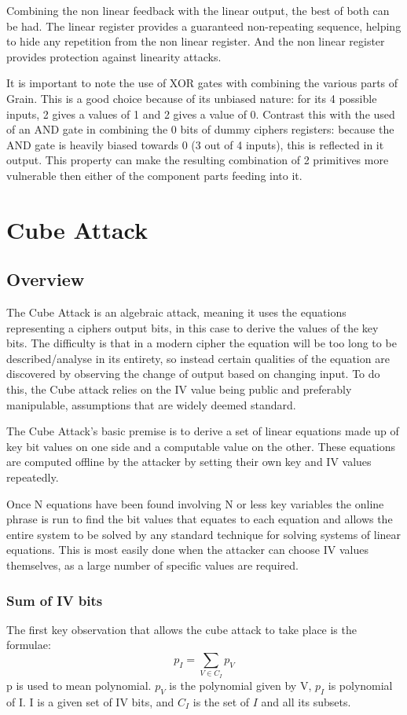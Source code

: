 \documentclass{report}
\let\Oldsection\section
\renewcommand{\section}{\FloatBarrier\Oldsection}
\let\Oldsubsection\subsection
\renewcommand{\subsection}{\FloatBarrier\Oldsubsection}
\begin{document}
Combining the non linear feedback with the linear output, the best of both can be had. The linear register provides a guaranteed non-repeating sequence, helping to hide any repetition from the non linear register. And the non linear register provides protection against linearity attacks.

It is important to note the use of XOR gates with combining the various parts of Grain. This is a good choice because of its unbiased nature: for its 4 possible inputs, 2 gives a values of 1 and 2 gives a value of 0. Contrast this with the used of an AND gate in combining the 0 bits of dummy ciphers registers: because the AND gate is heavily biased towards 0 (3 out of 4 inputs), this is reflected in it output. This property can make the resulting combination of 2 primitives more vulnerable then either of the component parts feeding into it.%


\chapter{Cube Attack}
\section{Overview}
The Cube Attack is an algebraic attack, meaning it uses the equations representing a ciphers output bits, in this case to derive the values of the key bits. The difficulty is that in a modern cipher the equation will be too long to be described/analyse in its entirety, so instead certain qualities of the equation are discovered by observing the change of output based on changing input. To do this, the Cube attack relies on the IV value being public and preferably manipulable, assumptions that are widely deemed standard. %

The Cube Attack's basic premise is to derive a set of linear equations made up of key bit values on one side and a computable value on the other. These equations are computed offline by the attacker by setting their own key and IV values repeatedly.

Once N equations have been found involving N or less key variables the online phrase is run to find the bit values that equates to each equation and allows the entire system to be solved by any standard technique for solving systems of linear equations. %
This is most easily done when the attacker can choose IV values themselves, as a large number of specific values are required.
\subsection{Sum of IV bits}
The first key observation that allows the cube attack to take place is the formulae:
\begin{equation} \label{eq:poly_sum}
p_I = \sum\limits_{V \in C_I} p_V 
\end{equation}
p is used to mean polynomial. $p_V$ is the polynomial given by V, $p_I$ is polynomial of I. I is a given set of IV bits, and $C_I$ is the set of $I$ and all its subsets.
\end{document}
